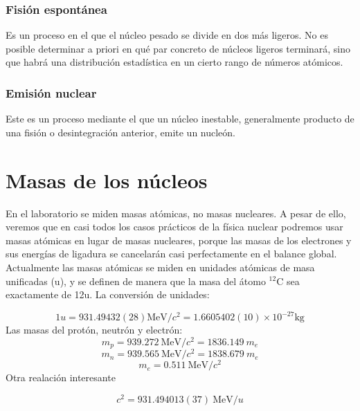 \subsubsection{Fisión espontánea}

Es un proceso  en el que el núcleo pesado se divide en dos más ligeros. No es posible determinar a priori en qué par concreto de núcleos ligeros terminará, sino que habrá una distribución estadística en un cierto rango de números atómicos.

\subsubsection{Emisión nuclear}

Este es un proceso mediante el que un núcleo inestable, generalmente producto de una fisión o desintegración anterior, emite un nucleón.

\section{Masas de los núcleos}

En el laboratorio se miden masas atómicas, no masas nucleares. A pesar de ello, veremos que en casi todos los casos prácticos de la física nuclear podremos usar masas atómicas en lugar de masas nucleares, porque las masas de los electrones y sus energías de ligadura se cancelarán casi perfectamente en el balance global. Actualmente las masas atómicas se miden en unidades atómicas de masa unificadas (u), y se definen de manera que la masa del átomo $^{12}$C sea exactamente de 12u. La conversión de unidades:

\begin{equation}
	1u = 931.49432(28) \unit{\MeV/c^2} = 1.6605402(10) \times 10^{-27} \unit{\kg}
\end{equation}
Las masas del protón, neutrón y electrón:
\begin{equation}
	m_p = 939.272  \ \unit{\MeV/c^2} = 1836.149 \ m_e
\end{equation} 
\begin{equation}
	m_n = 939.565 \ \unit{\MeV/c^2} = 1838.679 \ m_e
\end{equation}
\begin{equation}
	m_e = 0.511 \ \unit{\MeV/c^2}
\end{equation}
Otra realación interesante

\begin{equation}
	c^2 = 931.494013(37)\ \unit{\MeV/u}
\end{equation}

